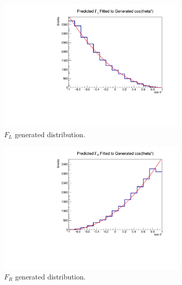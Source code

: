 \documentclass[12pt,a4paper]{article}
\numberwithin{equation}{section}
\begin{document}
\begin{figure}[t!]
    \centering
    \begin{subfigure}[t]{0.5\textwidth}
        \centering
        \includegraphics[width=1.0\textwidth]{figures/delphes_genL}
        \caption{$F_L$ generated distribution.}
    \end{subfigure}%
    \begin{subfigure}[t]{0.5\textwidth}
        \centering
        \includegraphics[width=1.0\textwidth]{figures/delphes_genR}
        \caption{$F_R$ generated distribution.}
      \end{subfigure}
    \begin{subfigure}[t]{0.5\textwidth}
        \centering

\end{subfigure}
\end{figure}
\end{document}
